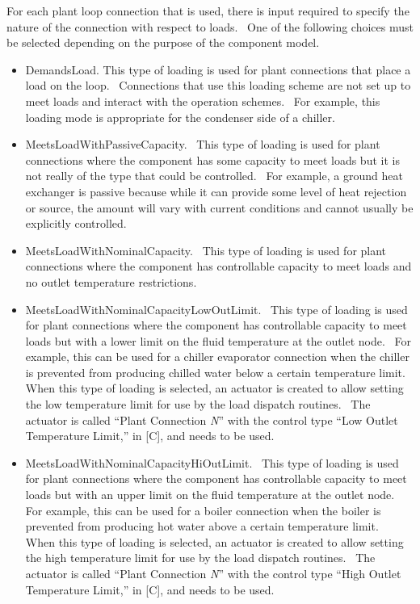 For each plant loop connection that is used, there is input required to specify the nature of the connection with respect to loads.~ One of the following choices must be selected depending on the purpose of the component model.

\begin{itemize}
\item
  DemandsLoad. This type of loading is used for plant connections that place a load on the loop.~ Connections that use this loading scheme are not set up to meet loads and interact with the operation schemes.~ For example, this loading mode is appropriate for the condenser side of a chiller.
\item
  MeetsLoadWithPassiveCapacity.~ This type of loading is used for plant connections where the component has some capacity to meet loads but it is not really of the type that could be controlled.~ For example, a ground heat exchanger is passive because while it can provide some level of heat rejection or source, the amount will vary with current conditions and cannot usually be explicitly controlled.
\item
  MeetsLoadWithNominalCapacity.~ This type of loading is used for plant connections where the component has controllable capacity to meet loads and no outlet temperature restrictions.
\item
  MeetsLoadWithNominalCapacityLowOutLimit.~ This type of loading is used for plant connections where the component has controllable capacity to meet loads but with a lower limit on the fluid temperature at the outlet node.~ For example, this can be used for a chiller evaporator connection when the chiller is prevented from producing chilled water below a certain temperature limit.~ When this type of loading is selected, an actuator is created to allow setting the low temperature limit for use by the load dispatch routines.~ The actuator is called ``Plant Connection \emph{N}'' with the control type ``Low Outlet Temperature Limit,'' in {[}C{]}, and needs to be used.
\item
  MeetsLoadWithNominalCapacityHiOutLimit.~ This type of loading is used for plant connections where the component has controllable capacity to meet loads but with an upper limit on the fluid temperature at the outlet node.~ For example, this can be used for a boiler connection when the boiler is prevented from producing hot water above a certain temperature limit.~ When this type of loading is selected, an actuator is created to allow setting the high temperature limit for use by the load dispatch routines.~ The actuator is called ``Plant Connection \emph{N}'' with the control type ``High Outlet Temperature Limit,'' in {[}C{]}, and needs to be used.
\end{itemize}

